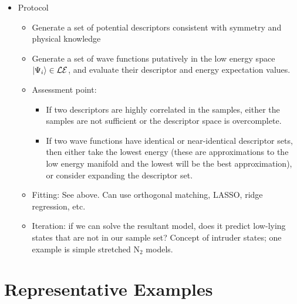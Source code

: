 \documentclass[prl,12pt,onecolumn,nofootinbib,notitlepage,english,superscriptaddress]{revtex4-1}
\newcommand{\lucas}[1]{{\color{GREEN}{\bf LKW: #1}}}
\begin{document}
\begin{itemize}
\item Protocol \lucas{this overlaps a little with 'Fitting procedure'; we should discuss how to merge/cut them. We will also probably want a graphic.} 
   \begin{itemize}
   \item Generate a set of potential descriptors consistent with symmetry and physical knowledge
   \item Generate a set of wave functions putatively in the low energy space $|\Psi_i\rangle \in {\cal LE} $, and evaluate their descriptor and energy expectation values.
   \item Assessment point: 
      \begin{itemize}
      \item If two descriptors are highly correlated in the samples, either the samples are not sufficient or the descriptor space is overcomplete.
      \item If two wave functions have identical or near-identical descriptor sets, then either take the lowest energy (these are approximations to the low energy manifold and the lowest will be the best approximation), or consider expanding the descriptor set.
      \end{itemize}
   \item Fitting: See above. Can use orthogonal matching, LASSO, ridge regression, etc.
   \item Iteration: if we can solve the resultant model, does it predict low-lying states that are not in our sample set? Concept of intruder states; one example is simple stretched N$_2$ models.
   \end{itemize}
\end{itemize}



\section{Representative Examples}
\end{document}
